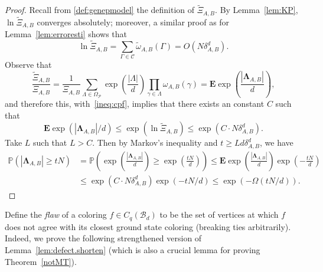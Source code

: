 \documentclass{amsart}
\theoremstyle{definition}
\newcommand{\bO}{O}
\newcommand{\we}{\omega}
\newcommand{\cB}{\mathcal{B} }
\newcommand{\cC}{\mathcal{C} }
\newcommand{\cP}{\mathcal{P} }
\newcommand{\bE}{\mathbf{E}}
\newcommand{\0}[0]{\emptyset}
\newcommand{\pr}[0]{\mathbb{P}}
\begin{document}
\begin{proof}
Recall from \eqref{def:genepmodel} the definition of $\tilde{\Xi}_{A, B}$.
By Lemma~\ref{lem:KP}, $\ln\tilde{\Xi}_{A, B}$ converges absolutely; moreover, a similar proof as for Lemma~\ref{lem:erroresti} shows that 
\begin{equation}\label{ineq:cpf}
\ln\tilde{\Xi}_{A, B} = \sum_{\Gamma\in \cC}\tilde{\we}_{A, B}(\Gamma) = \bO\left(N\delta_{A, B}^d\right).
\end{equation}
Observe that
\[
\frac{\tilde{\Xi}_{A, B}}{\Xi_{A, B}} = \frac{1}{\Xi_{A, B}}\sum_{\Lambda\in\Omega_{\cP}}\exp\left(\frac{|\Lambda|}{d}\right)\prod_{\gamma\in\Lambda}\we_{A, B}(\gamma)=\bE\exp\left(\frac{|\mathbf{\Lambda}_{A, B}|}{d}\right),
\]
and therefore this, with~\eqref{ineq:cpf}, implies that there exists an constant $C$ such that 
\[
\bE\exp\left(|\mathbf{\Lambda}_{A, B}|/d\right) \leq \exp\left(\ln\tilde{\Xi}_{A, B}\right)\leq  \exp\left(C\cdot N\delta_{A, B}^d\right).
\]
Take $L$ such that $L > C$. Then by Markov's inequality and $t\geq Ld\delta_{A, B}^d$, we have
\[
\begin{split}
\pr\left(|\mathbf{\Lambda}_{A, B}|\geq tN\right)
&=\pr\left(\exp\left(\frac{|\mathbf{\Lambda}_{A, B}|}{d}\right)\geq \exp\left( \frac{tN}{d}\right)\right)
\leq \bE\exp\left(\frac{|\mathbf{\Lambda}_{A, B}|}{d}\right)\exp\left(-\frac{tN}{d}\right)\\
&\leq  \exp\left(C\cdot N\delta_{A, B}^d\right)\exp\left(-tN/d\right)\leq \exp\left(-\Omega\left(tN/d\right)\right).
\end{split}
\]
\end{proof}





Define the \textit{flaw} of a coloring $f \in C_q(\cB_d)$ to be the set of vertices at which $f$ does not agree with its closest ground state coloring (breaking ties arbitrarily). 
Indeed, we prove the following strengthened version of Lemma~\ref{lem:defect.shorten} (which is also a crucial lemma for proving Theorem~\ref{notMT}).
\end{document}
